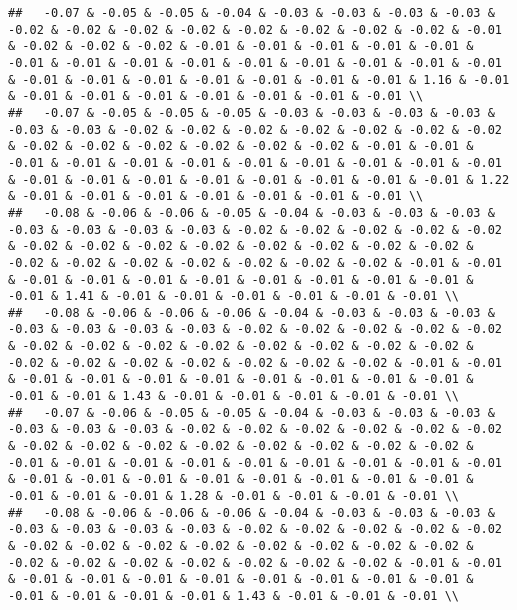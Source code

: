 \documentclass[
]{article}
\begin{document}
\begin{verbatim}
##   -0.07 & -0.05 & -0.05 & -0.04 & -0.03 & -0.03 & -0.03 & -0.03 & -0.02 & -0.02 & -0.02 & -0.02 & -0.02 & -0.02 & -0.02 & -0.02 & -0.01 & -0.02 & -0.02 & -0.02 & -0.01 & -0.01 & -0.01 & -0.01 & -0.01 & -0.01 & -0.01 & -0.01 & -0.01 & -0.01 & -0.01 & -0.01 & -0.01 & -0.01 & -0.01 & -0.01 & -0.01 & -0.01 & -0.01 & -0.01 & -0.01 & 1.16 & -0.01 & -0.01 & -0.01 & -0.01 & -0.01 & -0.01 & -0.01 & -0.01 \\ 
##   -0.07 & -0.05 & -0.05 & -0.05 & -0.03 & -0.03 & -0.03 & -0.03 & -0.03 & -0.03 & -0.02 & -0.02 & -0.02 & -0.02 & -0.02 & -0.02 & -0.02 & -0.02 & -0.02 & -0.02 & -0.02 & -0.02 & -0.02 & -0.01 & -0.01 & -0.01 & -0.01 & -0.01 & -0.01 & -0.01 & -0.01 & -0.01 & -0.01 & -0.01 & -0.01 & -0.01 & -0.01 & -0.01 & -0.01 & -0.01 & -0.01 & -0.01 & 1.22 & -0.01 & -0.01 & -0.01 & -0.01 & -0.01 & -0.01 & -0.01 \\ 
##   -0.08 & -0.06 & -0.06 & -0.05 & -0.04 & -0.03 & -0.03 & -0.03 & -0.03 & -0.03 & -0.03 & -0.03 & -0.02 & -0.02 & -0.02 & -0.02 & -0.02 & -0.02 & -0.02 & -0.02 & -0.02 & -0.02 & -0.02 & -0.02 & -0.02 & -0.02 & -0.02 & -0.02 & -0.02 & -0.02 & -0.02 & -0.02 & -0.01 & -0.01 & -0.01 & -0.01 & -0.01 & -0.01 & -0.01 & -0.01 & -0.01 & -0.01 & -0.01 & 1.41 & -0.01 & -0.01 & -0.01 & -0.01 & -0.01 & -0.01 \\ 
##   -0.08 & -0.06 & -0.06 & -0.06 & -0.04 & -0.03 & -0.03 & -0.03 & -0.03 & -0.03 & -0.03 & -0.03 & -0.02 & -0.02 & -0.02 & -0.02 & -0.02 & -0.02 & -0.02 & -0.02 & -0.02 & -0.02 & -0.02 & -0.02 & -0.02 & -0.02 & -0.02 & -0.02 & -0.02 & -0.02 & -0.02 & -0.02 & -0.01 & -0.01 & -0.01 & -0.01 & -0.01 & -0.01 & -0.01 & -0.01 & -0.01 & -0.01 & -0.01 & -0.01 & 1.43 & -0.01 & -0.01 & -0.01 & -0.01 & -0.01 \\ 
##   -0.07 & -0.06 & -0.05 & -0.05 & -0.04 & -0.03 & -0.03 & -0.03 & -0.03 & -0.03 & -0.03 & -0.02 & -0.02 & -0.02 & -0.02 & -0.02 & -0.02 & -0.02 & -0.02 & -0.02 & -0.02 & -0.02 & -0.02 & -0.02 & -0.02 & -0.01 & -0.01 & -0.01 & -0.01 & -0.01 & -0.01 & -0.01 & -0.01 & -0.01 & -0.01 & -0.01 & -0.01 & -0.01 & -0.01 & -0.01 & -0.01 & -0.01 & -0.01 & -0.01 & -0.01 & 1.28 & -0.01 & -0.01 & -0.01 & -0.01 \\ 
##   -0.08 & -0.06 & -0.06 & -0.06 & -0.04 & -0.03 & -0.03 & -0.03 & -0.03 & -0.03 & -0.03 & -0.03 & -0.02 & -0.02 & -0.02 & -0.02 & -0.02 & -0.02 & -0.02 & -0.02 & -0.02 & -0.02 & -0.02 & -0.02 & -0.02 & -0.02 & -0.02 & -0.02 & -0.02 & -0.02 & -0.02 & -0.02 & -0.01 & -0.01 & -0.01 & -0.01 & -0.01 & -0.01 & -0.01 & -0.01 & -0.01 & -0.01 & -0.01 & -0.01 & -0.01 & -0.01 & 1.43 & -0.01 & -0.01 & -0.01 \\ 

\end{verbatim}
\end{document}
